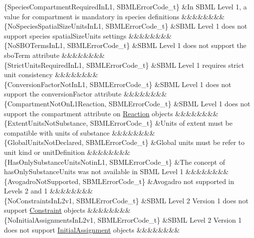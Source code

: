 \begin{DoxyParagraph}{}
\begin{longtabu}
\{Species\+Compartment\+Required\+In\+L1, S\+B\+M\+L\+Error\+Code\+\_\+t\} &In S\+B\+ML Level 1, a value for \textquotesingle{}compartment\textquotesingle{} is mandatory in species definitions &&&&&&&&\\
\{No\+Species\+Spatial\+Size\+Units\+In\+L1, S\+B\+M\+L\+Error\+Code\+\_\+t\} &S\+B\+ML Level 1 does not support species \textquotesingle{}spatial\+Size\+Units\textquotesingle{} settings &&&&&&&&\\
\{No\+S\+B\+O\+Terms\+In\+L1, S\+B\+M\+L\+Error\+Code\+\_\+t\} &S\+B\+ML Level 1 does not support the \textquotesingle{}sbo\+Term\textquotesingle{} attribute &&&&&&&&\\
\{Strict\+Units\+Required\+In\+L1, S\+B\+M\+L\+Error\+Code\+\_\+t\} &S\+B\+ML Level 1 requires strict unit consistency &&&&&&&&\\
\{Conversion\+Factor\+Not\+In\+L1, S\+B\+M\+L\+Error\+Code\+\_\+t\} &S\+B\+ML Level 1 does not support the \textquotesingle{}conversion\+Factor\textquotesingle{} attribute &&&&&&&&\\
\{Compartment\+Not\+On\+L1\+Reaction, S\+B\+M\+L\+Error\+Code\+\_\+t\} &S\+B\+ML Level 1 does not support the \textquotesingle{}compartment\textquotesingle{} attribute on \hyperlink{class_reaction}{Reaction} objects &&&&&&&&\\
\{Extent\+Units\+Not\+Substance, S\+B\+M\+L\+Error\+Code\+\_\+t\} &Units of extent must be compatible with units of substance &&&&&&&&\\
\{Global\+Units\+Not\+Declared, S\+B\+M\+L\+Error\+Code\+\_\+t\} &Global units must be refer to unit kind or unit\+Definition &&&&&&&&\\
\{Has\+Only\+Substance\+Units\+Notin\+L1, S\+B\+M\+L\+Error\+Code\+\_\+t\} &The concept of has\+Only\+Substance\+Units was not available in S\+B\+ML Level 1 &&&&&&&&\\
\{Avogadro\+Not\+Supported, S\+B\+M\+L\+Error\+Code\+\_\+t\} &Avogadro not supported in Levels 2 and 1 &&&&&&&&\\
\{No\+Constraints\+In\+L2v1, S\+B\+M\+L\+Error\+Code\+\_\+t\} &S\+B\+ML Level 2 Version 1 does not support \hyperlink{class_constraint}{Constraint} objects &&&&&&&&\\
\{No\+Initial\+Assignments\+In\+L2v1, S\+B\+M\+L\+Error\+Code\+\_\+t\} &S\+B\+ML Level 2 Version 1 does not support \hyperlink{class_initial_assignment}{Initial\+Assignment} objects &&&&&&&&\\

\end{longtabu}
\end{DoxyParagraph}
